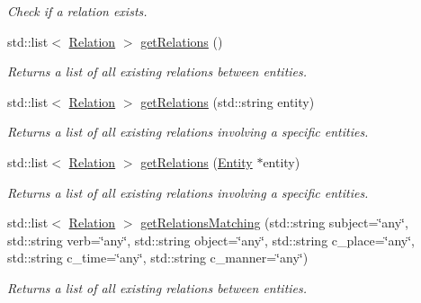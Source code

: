 \begin{DoxyCompactItemize}
\begin{DoxyCompactList}\small\item\em Check if a relation exists. \end{DoxyCompactList}\item 
std\+::list$<$ \hyperlink{group__icubclient__representations_classicubclient_1_1Relation}{Relation} $>$ \hyperlink{group__icubclient__clients_a10a9d5b6006fce9a32c82f19ae03ae74}{get\+Relations} ()
\begin{DoxyCompactList}\small\item\em Returns a list of all existing relations between entities. \end{DoxyCompactList}\item 
std\+::list$<$ \hyperlink{group__icubclient__representations_classicubclient_1_1Relation}{Relation} $>$ \hyperlink{group__icubclient__clients_a1a3ea6255bc9da44f281fa767801587e}{get\+Relations} (std\+::string entity)
\begin{DoxyCompactList}\small\item\em Returns a list of all existing relations involving a specific entities. \end{DoxyCompactList}\item 
std\+::list$<$ \hyperlink{group__icubclient__representations_classicubclient_1_1Relation}{Relation} $>$ \hyperlink{group__icubclient__clients_a7a5d4c886b537244cf7fbd25d4141388}{get\+Relations} (\hyperlink{group__icubclient__representations_classicubclient_1_1Entity}{Entity} $\ast$entity)
\begin{DoxyCompactList}\small\item\em Returns a list of all existing relations involving a specific entities. \end{DoxyCompactList}\item 
std\+::list$<$ \hyperlink{group__icubclient__representations_classicubclient_1_1Relation}{Relation} $>$ \hyperlink{group__icubclient__clients_a6df65f36cc97fe26d05df85c3c56faed}{get\+Relations\+Matching} (std\+::string subject=\char`\"{}any\char`\"{}, std\+::string verb=\char`\"{}any\char`\"{}, std\+::string object=\char`\"{}any\char`\"{}, std\+::string c\+\_\+place=\char`\"{}any\char`\"{}, std\+::string c\+\_\+time=\char`\"{}any\char`\"{}, std\+::string c\+\_\+manner=\char`\"{}any\char`\"{})
\begin{DoxyCompactList}\small\item\em Returns a list of all existing relations between entities. \end{DoxyCompactList}\item 

\end{DoxyCompactItemize}
